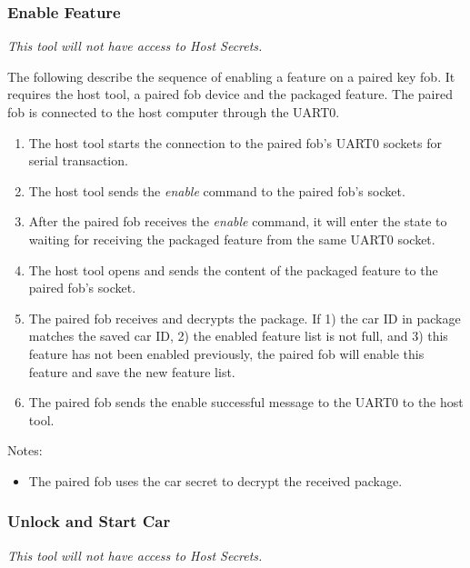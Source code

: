 \documentclass[11pt,oneside,onecolumn,letterpaper]{article}
\begin{document}
\subsubsection{Enable Feature}

\textit{This tool will not have access to Host Secrets.}

The following describe the sequence of enabling a feature on a paired key fob. It requires the host tool, a paired fob device and the packaged feature. The paired fob is connected to the host computer through the UART0.
\begin{enumerate}
	\item The host tool starts the connection to the paired fob's UART0 sockets for serial transaction.
	\item The host tool sends the \textit{enable} command to the paired fob's socket.
	\item After the paired fob receives the \textit{enable} command, it will enter the state to waiting for receiving the packaged feature from the same UART0 socket.
	\item The host tool opens and sends the content of the packaged feature to the paired fob's socket.
	\item The paired fob receives and decrypts the package. If 1) the car ID in package matches the saved car ID, 2) the enabled feature list is not full, and 3) this feature has not been  enabled previously, the paired fob will enable this feature and save the new feature list.
	\item The paired fob sends the enable successful message to the UART0 to the host tool.
\end{enumerate}

Notes:
\begin{itemize}
	\item The paired fob uses the car secret to decrypt the received package.
\end{itemize}

\subsubsection{Unlock and Start Car}

\textit{This tool will not have access to Host Secrets.}
\end{document}
